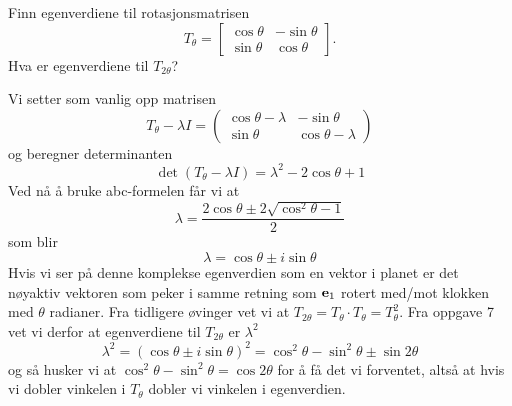 \begin{oppgave}
Finn egenverdiene til rotasjonsmatrisen
\[
T_{\theta}=
\begin{bmatrix}
\cos \theta & -\sin \theta  \\ \sin \theta & \cos \theta  
\end{bmatrix}.
\]
Hva er egenverdiene til $T_{2 \theta}$?
\end{oppgave}


\begin{losning}
Vi setter som vanlig opp matrisen
\begin{equation*}
	T_\theta - \lambda I = 
	\begin{pmatrix}
	\cos \theta - \lambda & -\sin\theta \\
	\sin\theta & \cos\theta - \lambda
\end{pmatrix}
\end{equation*}
og beregner determinanten
\begin{equation*}
	\det(T_\theta - \lambda I) = \lambda^2 - 2\cos\theta + 1
\end{equation*}
Ved nå å bruke abc-formelen får vi at 
\begin{equation*}
	\lambda = \frac{2\cos\theta \pm 2\sqrt{\cos ^2\theta - 1}}{2}
\end{equation*}	
som blir
\begin{equation*}
	\lambda = \cos\theta \pm i\sin\theta
\end{equation*}
Hvis vi ser på denne komplekse egenverdien som en vektor i planet er det nøyaktiv vektoren som peker i samme retning som $\mathbf{e}_1$ rotert med/mot klokken med $\theta$ radianer. Fra tidligere øvinger vet vi at $T_{2\theta} = T_\theta\cdot T_\theta = T_\theta^2$. Fra oppgave 7 vet vi derfor at egenverdiene til  $T_{2\theta}$ er $\lambda^2$
\begin{equation*}
	\lambda^2 = (\cos\theta \pm i\sin\theta)^2 = \cos^2\theta - \sin^2\theta \pm \sin2\theta
\end{equation*}
og så husker vi at $\cos^2\theta - \sin^2\theta = \cos 2\theta$ for å få det vi forventet, altså at hvis vi dobler vinkelen i $T_\theta$ dobler vi vinkelen i egenverdien.
\end{losning}


